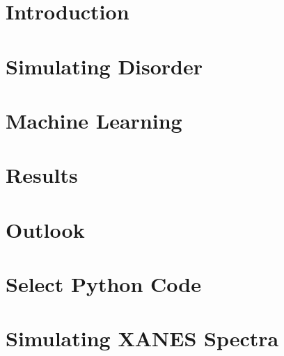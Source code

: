 \documentclass[12pt, oneside]{book}
\begin{document}
\listoffigures

\mainmatter

\chapter{Introduction}


\chapter{Simulating Disorder}


\chapter{Machine Learning}


\chapter{Results}


\chapter{Outlook}



\appendix 


\chapter{Select Python Code}


\chapter{Simulating XANES Spectra}


% 

\end{document}
